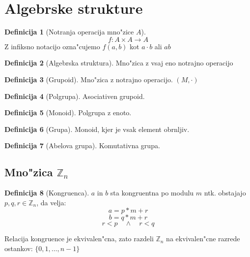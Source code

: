 \documentclass{article}
\theoremstyle{definition}
\newtheorem{definition}{Definicija}[section]
\theoremstyle{remark}
\newcommand{\Z}{\mathbb{Z}}
\begin{document}
	\section{Algebrske strukture}
	\begin{definition}[Notranja operacija mno"zice $A$]
		\[ f: A \times A \rightarrow A\]
		Z infiksno notacijo ozna"cujemo $f(a,b)$ kot $a \cdot b$ ali $ab$
	\end{definition}
	\begin{definition}[Algebrska struktura]
		Mno"zica z vsaj eno notrajno operacijo
	\end{definition}
	\begin{definition}[Grupoid]
		Mno"zica z notrajno operacijo. $(M, \cdot)$
	\end{definition}
	\begin{definition}[Polgrupa]
		Asociativen grupoid.
	\end{definition}
	\begin{definition}[Monoid]
		Polgrupa z enoto.
	\end{definition}
	\begin{definition}[Grupa]
		Monoid, kjer je vsak element obrnljiv.
	\end{definition}
	\begin{definition}[Abelova grupa]
		Komutativna grupa.
	\end{definition}

	\begin{comment}
	\begin{definition}[Kolobar]
		Mno"zica z 2 operacijama $(M, +, \cdot)$ \\
		kjer je $(M, +)$ abelova grupa in $(M, \cdot)$ monoid.
	\end{definition}
	\begin{definition}[Obseg]
		Kolobar, kjer so neni"celni elementi grupa za $\cdot$
	\end{definition}
	\begin{definition}[Polje]
		Komutativni obseg
	\end{definition}
	\begin{definition}[Modul]
		Kolobar z abelovo grupo $((M, +, \cdot), (V, \oplus))$
	\end{definition}
	\begin{definition}[Vektorski prostor]
		Modul, kjer je $(M, +, \cdot)$ polje.
	\end{definition}
	\end{comment}
	\subsection{Mno"zica $\Z_n$}
	\begin{definition}[Kongruenca]
			$a$ in $b$ sta kongruentna po modulu $m$ ntk. obstajajo $p,q,r \in \Z_n$, da velja:
			\[ a = p*m + r \]
			\[ b = q*m + r \]
			\[ r < p \quad \land \quad r < q \]
	\end{definition}
	Relacija kongruence je ekvivalen"cna, zato razdeli $\Z_n$ na ekvivalen"cne razrede ostankov: $\lbrace 0, 1, \ldots, n-1 \rbrace$
	
\end{document}

